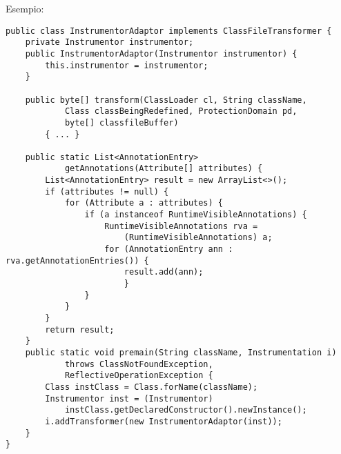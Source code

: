 Esempio:
\begin{verbatim}
public class InstrumentorAdaptor implements ClassFileTransformer {
    private Instrumentor instrumentor;
    public InstrumentorAdaptor(Instrumentor instrumentor) {
        this.instrumentor = instrumentor;
    }

    public byte[] transform(ClassLoader cl, String className,
            Class classBeingRedefined, ProtectionDomain pd,
            byte[] classfileBuffer)
        { ... }

    public static List<AnnotationEntry>
            getAnnotations(Attribute[] attributes) {
        List<AnnotationEntry> result = new ArrayList<>();
        if (attributes != null) {
            for (Attribute a : attributes) {
                if (a instanceof RuntimeVisibleAnnotations) {
                    RuntimeVisibleAnnotations rva =
                        (RuntimeVisibleAnnotations) a;
                    for (AnnotationEntry ann : rva.getAnnotationEntries()) {
                        result.add(ann);
                        }
                }
            }
        }
        return result;
    }
    public static void premain(String className, Instrumentation i)
            throws ClassNotFoundException,
            ReflectiveOperationException {
        Class instClass = Class.forName(className);
        Instrumentor inst = (Instrumentor)
            instClass.getDeclaredConstructor().newInstance();
        i.addTransformer(new InstrumentorAdaptor(inst));
    }
}
\end{verbatim}




